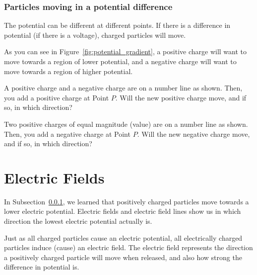 \documentclass[12pt,paper=letter]{scrartcl}
\begin{document}
    \subsubsection{Particles moving in a potential difference}\label{subsec:potential-difference}
    
    The potential can be different at different points.
    If there is a difference in potential (if there is a voltage), charged particles will move.

    \pnp

    As you can see in Figure~\ref{fig:potential_gradient},
    a positive charge will want to move towards a region of lower potential,
    and a negative charge will want to move towards a region of higher potential.

    \begin{exrboxed}
        A positive charge and a negative charge are on a number line as shown.
        Then, you add a positive charge at Point $P$.
        Will the new positive charge move, and if so,
        in which direction?

        \medskip

        
        \label{exr:number_line_1}
    \end{exrboxed}
    \begin{exrboxed}[Challenge]
        Two positive charges of equal magnitude (value) are on a number line as shown.
        Then, you add a negative charge at Point $P$.
        Will the new negative charge move, and if so,
        in which direction?

        \medskip

        
        \label{exr:number_line_2}
    \end{exrboxed}


    \section{Electric Fields}\label{sec:electric-fields}
    In Subsection~\ref{subsec:potential-difference},
    we learned that positively charged particles move towards a lower electric potential.
    Electric fields and electric field lines show us in which direction the lowest electric potential actually is.

    \pnp

    Just as all charged particles cause an electric potential,
    all electrically charged particles induce (cause) an electric field.
    The electric field represents the direction a positively charged particle will move when released,
    and also how strong the difference in potential is.
\end{document}
